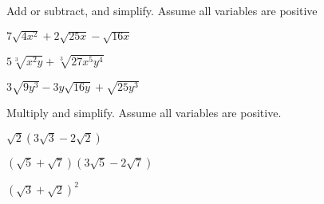 \begin{exercise}
	Add or subtract, and simplify. Assume all variables are positive\\
	\begin{enumerate*}[label={(\arabic*)~}]
		\item $7\sqrt{4x^2}+2\sqrt{25x}-\sqrt{16x}$
		\item $5\sqrt[3]{x^2y}+\sqrt[3]{27x^5y^4}$
		\item $3\sqrt{9y^3}-3y\sqrt{16y}+\sqrt{25y^3}$
		\hfill\null
	\end{enumerate*}
\end{exercise}
\vfill
\begin{center} \hfill
\end{center}



\begin{exercise}
	Multiply and simplify. Assume all variables are positive. \\
	\begin{enumerate*}[label={(\arabic*)~}]
		\item $\sqrt2(3\sqrt3-2\sqrt2)$
		\item $(\sqrt5+\sqrt7)(3\sqrt5-2\sqrt7)$
		\item $(\sqrt3+\sqrt2)^2$
		\hfill\null
	\end{enumerate*}
\end{exercise}



\vfill
\begin{center} \hfill
\end{center}

\newpage

